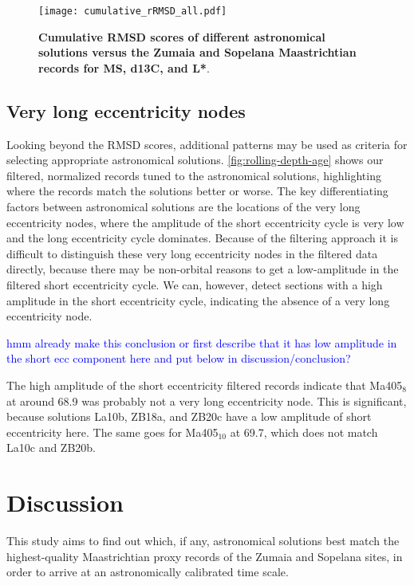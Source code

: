 \documentclass[draft]{agujournal2019}
\newcommand{\ijk}{\textcolor{blue}}
\begin{document}
\setcounter{figure}{3001}
\begin{figure}[htb]
  \centering
  \texttt{[image: cumulative\_rRMSD\_all.pdf]}
  \caption{\label{fig:cum-RMSD-all}
    \textbf{Cumulative \gls{RMSD} scores of different astronomical solutions versus the Zumaia and Sopelana Maastrichtian records for \gls{MS}, \gls{d13C}, and \gls{L*}}.
}
\end{figure}

\subsection{Very long eccentricity nodes}

Looking beyond the \gls{RMSD} scores, additional patterns may be used as criteria for selecting appropriate astronomical solutions.
\cref{fig:rolling-depth-age} shows our filtered, normalized records tuned to the astronomical solutions, highlighting where the records match the solutions better or worse.
The key differentiating factors between astronomical solutions are the locations of the very long eccentricity nodes, where the amplitude of the short eccentricity cycle is very low and the long eccentricity cycle dominates.
Because of the filtering approach it is difficult to distinguish these very long eccentricity nodes in the filtered data directly, because there may be non-orbital reasons to get a low-amplitude in the filtered short eccentricity cycle.
We can, however, detect sections with a high amplitude in the short eccentricity cycle, indicating the absence of a very long eccentricity node.

\ijk{hmm already make this conclusion or first describe that it has low amplitude in the short ecc component here and put below in discussion/conclusion?}

The high amplitude of the short eccentricity filtered records indicate that Ma405\(_{8}\) at around \qty{68.9}{\millionyearago} was probably not a very long eccentricity node.
This is significant, because solutions La10b, ZB18a, and ZB20c have a low amplitude of short eccentricity here.
The same goes for Ma405\(_{10}\) at \qty{69.7}{\millionyearago}, which does not match La10c and ZB20b.




\section{Discussion}\label{sec:discussion}

This study aims to find out which, if any, astronomical solutions best match the highest-quality Maastrichtian proxy records of the Zumaia and Sopelana sites, in order to arrive at an astronomically calibrated time scale.
\end{document}
